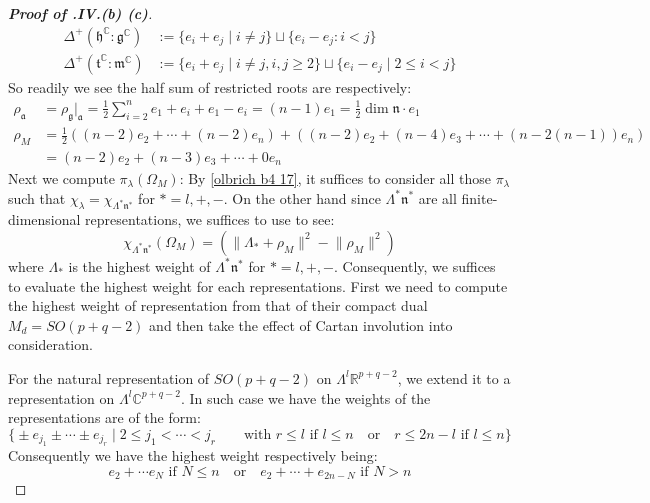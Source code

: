 \documentclass[11pt]{report}
\theoremstyle{definition}
\theoremstyle{plain}
\newcommand{\real}{\mathbb{R}}
\newcommand{\complex}{\mathbb{C}}
\newcommand{\norm}[1]{\lVert #1 \rVert}
\newcommand{\Lie}[1]{\mathfrak{#1}}
\begin{document}
\begin{proof}[\textbf{Proof of .IV.(b) (c)}]
\begin{equation*}
\begin{split}
\Delta^+(\Lie{h}^\complex:\Lie{g}^\complex)&:=\{e_i+e_j\mid i\neq j\}\sqcup \{e_i-e_j:i<j \}\\
\Delta^+(\Lie{t}^\complex:\Lie{m}^\complex)&:=\{e_i+e_j\mid i\neq j, i,j\geq 2\}\sqcup \{e_i-e_j\mid 2\leq i<j\}
\end{split}
\end{equation*}
So readily we see the half sum of restricted roots are respectively:
\begin{equation}
\begin{split}
\rho_{\Lie{a}}&=\rho_{\Lie{g}}|_\Lie{a}=\frac{1}{2}\sum_{i=2}^ne_1+e_i+e_1-e_i=(n-1)e_1=\frac{1}{2}\dim\Lie{n}\cdot e_1\\
\rho_M&=\frac{1}{2}((n-2)e_2+ \cdots+ (n-2)e_n)+((n-2)e_2+ (n-4)e_3+\cdots+(n-2(n-1))e_n)\\
&=(n-2)e_2+(n-3)e_3 +\cdots +0e_n
\end{split}
\end{equation}
Next we compute $\pi_{\lambda}(\Omega_M)$: By \ref{olbrich b4 17}, it suffices to consider all those $\pi_\lambda$ such that $\chi_{\lambda}=\chi_{\Lambda^*\Lie{n}^*}$ for $*=l, +, -$.  On the other hand since $\Lambda^*\Lie{n}^*$ are all finite-dimensional representations, we suffices to use  \cite[Proposition~5.28(b)]{knapp2013} to see:
\begin{equation}
\chi_{\Lambda^*\Lie{n}^*}(\Omega_M)=(\norm{\Lambda_*+\rho_M}^2-\norm{\rho_M}^2)
\end{equation}
 where $\Lambda_*$ is the highest weight of $\Lambda^*\Lie{n}^*$ for $*=l, +,-$. Consequently,  we suffices to evaluate the highest weight for each representations. First we need to compute the highest weight of representation from that of their compact dual $M_d=SO(p+q-2)$ and then take the effect of Cartan involution into consideration.
 \par For the natural representation of $SO(p+q-2)$ on $\Lambda^l\real^{p+q-2}$, we extend it to a representation on $\Lambda^l\complex^{p+q-2}$. In such case we have the weights of the representations are of the form:
\begin{equation*}
\Big\{\pm e_{j_1}\pm\cdots \pm e_{j_r} \mid 2\leq j_1<\cdots <j_r \qquad \text{with }r
\leq l \text{ if }l\leq n  \quad \text{or} \quad r\leq 2n-l \text{ if }l\leq n
\Big\}
\end{equation*}
Consequently we have the highest weight respectively being:
\begin{equation}
e_2+\cdots e_N \text{ if } N\leq n \quad \text{or} \quad e_2+\cdots +e_{2n-N} \text{ if }N>n

\end{equation}
\end{proof}
\end{document}
